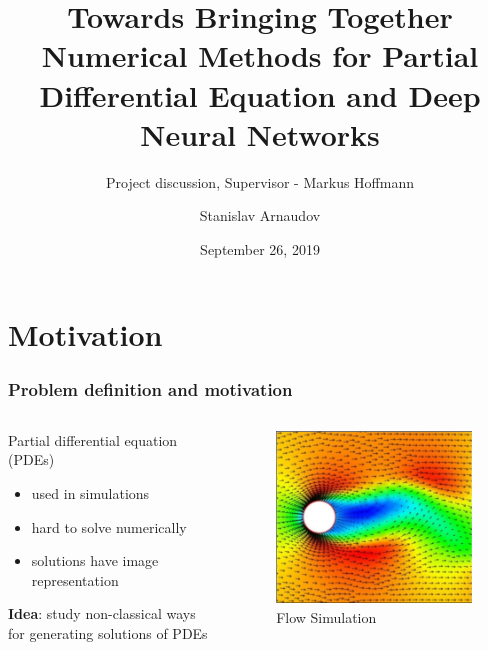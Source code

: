 \documentclass[18pt]{beamer}
\title[Project discussion]{Towards Bringing Together Numerical Methods for Partial Differential Equation and Deep Neural Networks}
\subtitle{Project discussion, Supervisor - Markus Hoffmann}
\author{Stanislav Arnaudov}
\institute{Chair for Computer Architecture and Parallel Processing}
\date{September 26, 2019}
\begin{document}
\begin{frame}
 \titlepage
\end{frame}

\section{Motivation}

\begin{frame}
  \frametitle{Problem definition and motivation}
  \begin{columns}
    \begin{column}{0.5\textwidth}
      Partial differential equation (PDEs)
      \begin{itemize}
      \item used in simulations
      \item hard to solve numerically
      \item solutions have image representation
      \end{itemize}
      \vspace{0.25cm}
      \textbf{Idea}: study non-classical ways for generating solutions of PDEs
      \vspace{-0.5cm}
    \end{column}
    \begin{column}{0.5\textwidth}
      \begin{center}
        \begin{figure}[htb]
          \includegraphics[scale=0.35]{images/pde}
          \caption{Flow Simulation\footnotemark}
        \end{figure}
      \end{center}
    \end{column}
  \end{columns}
\end{frame}
\end{document}
